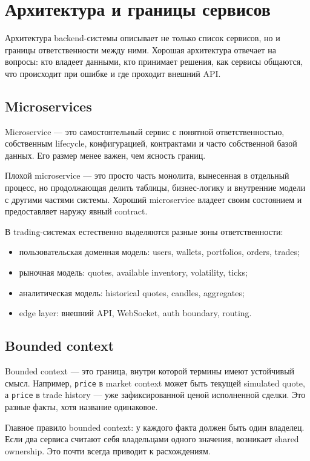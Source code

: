 \documentclass[12pt,a4paper]{article}
\begin{document}
\section{Архитектура и границы сервисов}

Архитектура backend-системы описывает не только список сервисов, но и границы
ответственности между ними. Хорошая архитектура отвечает на вопросы: кто владеет
данными, кто принимает решения, как сервисы общаются, что происходит при ошибке
и где проходит внешний API.

\subsection{Microservices}

Microservice --- это самостоятельный сервис с понятной ответственностью,
собственным lifecycle, конфигурацией, контрактами и часто собственной базой
данных. Его размер менее важен, чем ясность границ.

Плохой microservice --- это просто часть монолита, вынесенная в отдельный процесс,
но продолжающая делить таблицы, бизнес-логику и внутренние модели с другими
частями системы. Хороший microservice владеет своим состоянием и предоставляет
наружу явный contract.

В trading-системах естественно выделяются разные зоны ответственности:
\begin{itemize}
    \item пользовательская доменная модель: users, wallets, portfolios, orders, trades;
    \item рыночная модель: quotes, available inventory, volatility, ticks;
    \item аналитическая модель: historical quotes, candles, aggregates;
    \item edge layer: внешний API, WebSocket, auth boundary, routing.
\end{itemize}

\subsection{Bounded context}

Bounded context --- это граница, внутри которой термины имеют устойчивый смысл.
Например, \texttt{price} в market context может быть текущей simulated quote, а
\texttt{price} в trade history --- уже зафиксированной ценой исполненной сделки.
Это разные факты, хотя название одинаковое.

Главное правило bounded context: у каждого факта должен быть один владелец. Если
два сервиса считают себя владельцами одного значения, возникает shared ownership.
Это почти всегда приводит к расхождениям.
\end{document}
